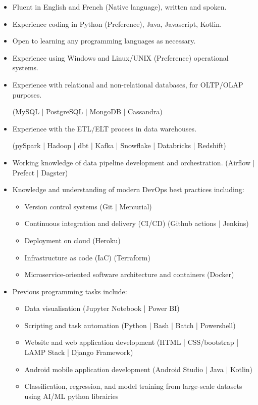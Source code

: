\documentclass[letterpaper, 10pt]{article}
\begin{document}
\begin{itemize}
    \item Fluent in English and French (Native language), written and spoken.
    \item Experience coding in Python (Preference), Java, Javascript, Kotlin.
    \item Open to learning any programming languages as necessary.
    \item Experience using Windows and Linux/UNIX (Preference) operational systems.
    \item Experience with relational and non-relational databases, for OLTP/OLAP purposes. 
    
    \hspace{1em} (MySQL | PostgreSQL | MongoDB | Cassandra)
    \item Experience with the ETL/ELT process in data warehouses.
    
    \hspace{1em} (pySpark | Hadoop | dbt | Kafka | Snowflake | Databricks | Redshift)
    \item Working knowledge of data pipeline development and orchestration. (Airflow | Prefect | Dagster)
        
    \item Knowledge and understanding of modern DevOps best practices including:
    \begin{itemize}
        \item Version control systems (Git | Mercurial)
        \item Continuous integration and delivery (CI/CD) (Github actions | Jenkins)
        \item Deployment on cloud (Heroku)
        \item Infrastructure as code (IaC) (Terraform)
        \item Microservice-oriented software architecture and containers (Docker)
    \end{itemize}
    
    \item Previous programming tasks include:
        \begin{itemize}
            \item Data visualisation (Jupyter Notebook | Power BI)
            \item Scripting and task automation (Python | Bash | Batch | Powershell)
            \item Website and web application development (HTML | CSS/bootstrap | LAMP Stack | Django Framework)
            \item Android mobile application  development (Android Studio | Java | Kotlin)
            \item Classification, regression, and model training from large-scale datasets using AI/ML python librairies
            

\end{itemize}
\end{itemize}
\end{document}
